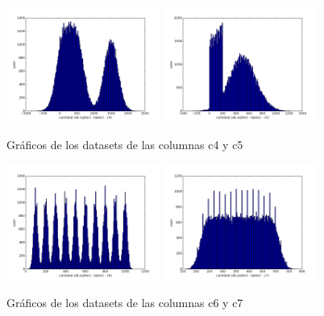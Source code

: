 \begin{figure}[h!]
  \centering
  \includegraphics[width=0.45\textwidth]{./images/c4}
  \includegraphics[width=0.45\textwidth]{./images/c5}
  \caption{Gráficos de los datasets de las columnas c4 y c5}
 \end{figure}
 
 
\begin{figure}[h!]
  \centering
  \includegraphics[width=0.45\textwidth]{./images/c6}
  \includegraphics[width=0.45\textwidth]{./images/c7}
  \caption{Gráficos de los datasets de las columnas c6 y c7}
 \end{figure}
 
